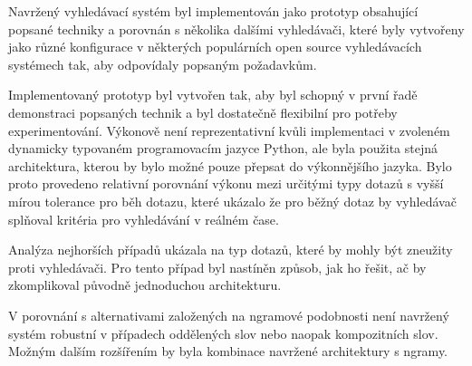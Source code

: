 \documentclass[11pt,letterpaper,oneside,openright]{book}
\begin{document}
Navržený vyhledávací systém byl implementován jako prototyp obsahující popsané
techniky a porovnán s několika dalšími vyhledávači, které byly vytvořeny jako
různé konfigurace v některých populárních open source vyhledávacích systémech
tak, aby odpovídaly popsaným požadavkům.

Implementovaný prototyp byl vytvořen tak, aby byl schopný v první řadě
demonstraci popsaných technik a byl dostatečně flexibilní pro potřeby
experimentování. Výkonově není reprezentativní kvůli implementaci v zvoleném
dynamicky typovaném programovacím jazyce Python, ale byla použita stejná
architektura, kterou by bylo možné pouze přepsat do výkonnějšího jazyka. Bylo
proto provedeno relativní porovnání výkonu mezi určitými typy dotazů s vyšší
mírou tolerance pro běh dotazu, které ukázalo že pro běžný dotaz by vyhledávač
splňoval kritéria pro vyhledávání v reálném čase.

Analýza nejhorších případů ukázala na typ dotazů, které by mohly být zneužity
proti vyhledávači. Pro tento případ byl nastíněn způsob, jak ho řešit, ač by
zkomplikoval původně jednoduchou architekturu.

V porovnání s alternativami založených na ngramové podobnosti není navržený
systém robustní v případech oddělených slov nebo naopak kompozitních slov.
Možným dalším rozšířením by byla kombinace navržené architektury s ngramy.


\renewcommand{\refname}{Reference}
\renewcommand{\bibname}{Reference}
\setlength{\bibsep}{0pt}

\end{document}
